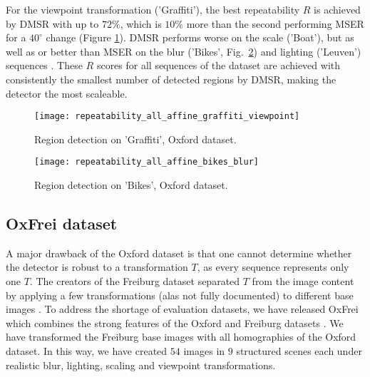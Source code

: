 \documentclass[conference,compsoc]{IEEEtran}
\begin{document}
For the viewpoint transformation ('Graffiti'), the best repeatability $R$ is achieved by DMSR with up to $72\%$, which is $10\%$ more than the second performing MSER for a $40^{\circ}$ change (Figure \ref{fig:det_graffiti}). DMSR performs worse on the scale ('Boat'), but as well as or better than MSER on the blur ('Bikes', Fig.~\ref{fig:det_bikes}) and lighting ('Leuven') sequences \cite{elena_ranguelova_2016_45156}. These $R$ scores for all sequences of the dataset are achieved with consistently the smallest number of detected regions by DMSR, making the detector the most scaleable.  
\begin{figure}[htb]
\centering
\begin{minipage}[b]{.99\linewidth}
  \centering
  \centerline{\texttt{[image: repeatability\_all\_affine\_graffiti\_viewpoint]}}
\end{minipage}
\hfill
\caption{Region detection on 'Graffiti', Oxford dataset.}
\label{fig:det_graffiti}
%
\end{figure}
\begin{figure}[htb]
\centering
\begin{minipage}[b]{.99\linewidth}
  \centering
  \centerline{\texttt{[image: repeatability\_all\_affine\_bikes\_blur]}}
\end{minipage}
\hfill
\caption{Region detection on 'Bikes', Oxford dataset.}
\label{fig:det_bikes}
%
\end{figure}


\subsection{OxFrei dataset}
\label{ssec:combined}
A major drawback of the Oxford dataset is that one cannot determine whether the detector is robust to a transformation $T$, as every sequence represents only one $T$. The creators of the Freiburg dataset separated $T$ from the image content by applying a few transformations (alas not fully documented) to different base images \cite{FischerDB14}. To address the shortage of evaluation datasets, we have released OxFrei which combines the strong features of the Oxford and Freiburg datasets \cite{elena_ranguelova_2016_45156}. We have transformed the Freiburg base images with all homographies of the Oxford dataset. In this way, we have created $54$ images in $9$ structured scenes each under realistic blur, lighting, scaling and viewpoint transformations.
\end{document}
